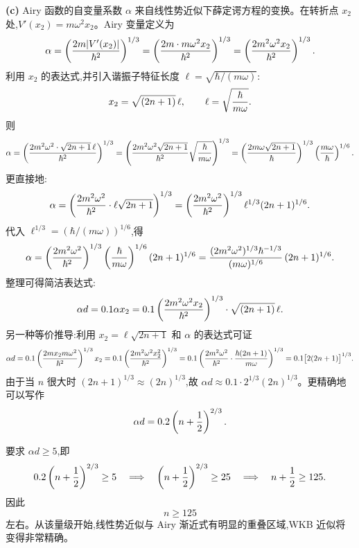 \begin{question}
\begin{solution}
\textbf{(c)} Airy 函数的自变量系数 $\alpha$ 来自线性势近似下薛定谔方程的变换。在转折点 $x_2$ 处,$V'(x_2)=m\omega^2x_2$。Airy 变量定义为
\[
\alpha=\left({2m|V'(x_2)|\over\hbar^2}\right)^{1/3}
=\left({2m\cdot m\omega^2x_2\over\hbar^2}\right)^{1/3}
=\left({2m^2\omega^2x_2\over\hbar^2}\right)^{1/3}.
\]
利用 $x_2$ 的表达式,并引入谐振子特征长度 $\ell=\sqrt{\hbar/(m\omega)}$:
\[
x_2=\sqrt{(2n+1)}\,\ell,\qquad
\ell=\sqrt{\hbar\over m\omega}.
\]
则
\[
\alpha=\left({2m^2\omega^2\cdot\sqrt{2n+1}\,\ell\over\hbar^2}\right)^{1/3}
=\left({2m^2\omega^2\sqrt{2n+1}\over\hbar^2}\sqrt{\hbar\over m\omega}\right)^{1/3}
=\left({2m\omega\sqrt{2n+1}\over\hbar}\right)^{1/3}
\left({m\omega\over\hbar}\right)^{1/6}.
\]
更直接地:
\[
\alpha=\left({2m^2\omega^2\over\hbar^2}\cdot\ell\sqrt{2n+1}\right)^{1/3}
=\left({2m^2\omega^2\over\hbar^2}\right)^{1/3}
\ell^{1/3}(2n+1)^{1/6}.
\]
代入 $\ell^{1/3}=(\hbar/(m\omega))^{1/6}$,得
\[
\alpha=\left({2m^2\omega^2\over\hbar^2}\right)^{1/3}
\left({\hbar\over m\omega}\right)^{1/6}(2n+1)^{1/6}
={ (2m^2\omega^2)^{1/3}\hbar^{-1/3}\over (m\omega)^{1/6}}\,(2n+1)^{1/6}.
\]
整理可得简洁表达式:
\[
\alpha d=0.1\alpha x_2=0.1\left({2m^2\omega^2x_2\over\hbar^2}\right)^{1/3}
\cdot\sqrt{(2n+1)}\,\ell.
\]
另一种等价推导:利用 $x_2=\ell\sqrt{2n+1}$ 和 $\alpha$ 的表达式可证
\[
\alpha d=0.1\left({2mx_2m\omega^2\over\hbar^2}\right)^{1/3}x_2
=0.1\left({2m^2\omega^2x_2^2\over\hbar^2}\right)^{1/3}
=0.1\left({2m^2\omega^2\over\hbar^2}\cdot{\hbar(2n+1)\over m\omega}\right)^{1/3}
=0.1\bigl[2(2n+1)\bigr]^{1/3}.
\]
由于当 $n$ 很大时 $(2n+1)^{1/3}\approx(2n)^{1/3}$,故 $\alpha d\approx0.1\cdot2^{1/3}(2n)^{1/3}$。更精确地可以写作
\[
\alpha d=0.2\left(n+{1\over2}\right)^{2/3}.
\]

要求 $\alpha d\ge5$,即
\[
0.2\left(n+{1\over2}\right)^{2/3}\ge5
\quad\Longrightarrow\quad
\left(n+{1\over2}\right)^{2/3}\ge25
\quad\Longrightarrow\quad
n+{1\over2}\ge125.
\]
因此
\[
\boxed{n\ge125}
\]
左右。从该量级开始,线性势近似与 Airy 渐近式有明显的重叠区域,WKB 近似将变得非常精确。
\end{solution}
\end{question}

